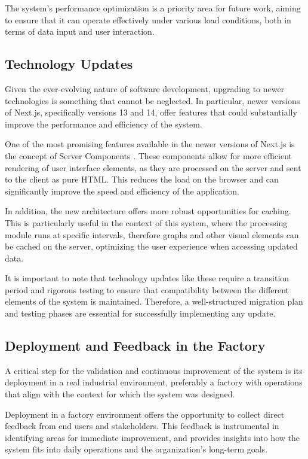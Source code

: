 The system's performance optimization is a priority area for future work, aiming to ensure that it can operate effectively under various load conditions, both in terms of data input and user interaction.

\subsection{Technology Updates}
Given the ever-evolving nature of software development, upgrading to newer technologies is something that cannot be neglected. In particular, newer versions of Next.js, specifically versions 13 and 14, offer features that could substantially improve the performance and efficiency of the system.

One of the most promising features available in the newer versions of Next.js is the concept of Server Components \cite{nextjsServerComponents}. These components allow for more efficient rendering of user interface elements, as they are processed on the server and sent to the client as pure HTML. This reduces the load on the browser and can significantly improve the speed and efficiency of the application.

In addition, the new architecture offers more robust opportunities for caching. This is particularly useful in the context of this system, where the processing module runs at specific intervals, therefore graphs and other visual elements can be cached on the server, optimizing the user experience when accessing updated data.

It is important to note that technology updates like these require a transition period and rigorous testing to ensure that compatibility between the different elements of the system is maintained. Therefore, a well-structured migration plan and testing phases are essential for successfully implementing any update.

\subsection{Deployment and Feedback in the Factory}

A critical step for the validation and continuous improvement of the system is its deployment in a real industrial environment, preferably a factory with operations that align with the context for which the system was designed.

Deployment in a factory environment offers the opportunity to collect direct feedback from end users and stakeholders. This feedback is instrumental in identifying areas for immediate improvement, and provides insights into how the system fits into daily operations and the organization's long-term goals.

